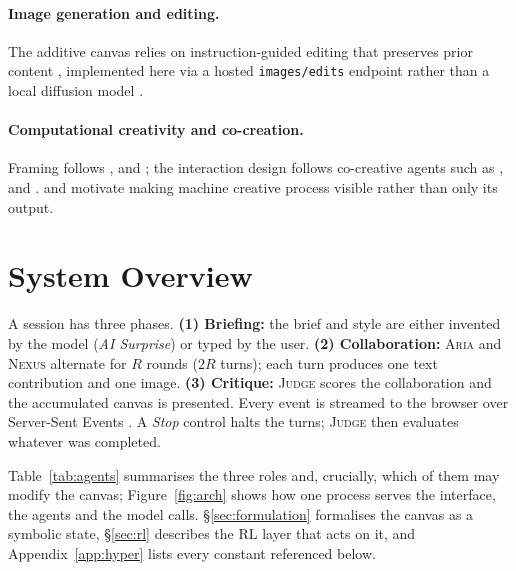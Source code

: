 \documentclass[11pt]{article}
\newcommand{\code}[1]{\texttt{\small #1}}
\newcommand{\ARIA}{\textsc{Aria}}
\newcommand{\NEXUS}{\textsc{Nexus}}
\newcommand{\JUDGE}{\textsc{Judge}}
\theoremstyle{plain}
\theoremstyle{definition}
\begin{document}
\paragraph{Image generation and editing.}
The additive canvas relies on instruction-guided editing that preserves prior
content \citep{meng2022sdedit,hertz2023prompt,brooks2023instructpix2pix},
implemented here via a hosted \code{images/edits} endpoint
\citep{microsoft2025azure} rather than a local diffusion model
\citep{rombach2022high}.

\paragraph{Computational creativity and co-creation.}
Framing follows \citet{boden2004creative}, \citet{colton2012computational} and
\citet{ritchie2007some}; the interaction design follows co-creative agents such
as \citet{davis2016empirically}, \citet{oh2018lead} and
\citet{karimi2020creative}. \citet{epstein2023art} and
\citet{doshi2024generative} motivate making machine creative process visible
rather than only its output.

\section{System Overview}
\label{sec:overview}
A session has three phases. \textbf{(1) Briefing:} the brief and style are
either invented by the model (\emph{AI Surprise}) or typed by the user.
\textbf{(2) Collaboration:} \ARIA{} and \NEXUS{} alternate for $R$ rounds
($2R$ turns); each turn produces one text contribution and one image.
\textbf{(3) Critique:} \JUDGE{} scores the collaboration and the accumulated
canvas is presented. Every event is streamed to the browser over Server-Sent
Events \citep{whatwg2024sse}. A \emph{Stop} control halts the turns; \JUDGE{}
then evaluates whatever was completed.

Table~\ref{tab:agents} summarises the three roles and, crucially, which of them
may modify the canvas; Figure~\ref{fig:arch} shows how one process serves the
interface, the agents and the model calls. \S\ref{sec:formulation} formalises
the canvas as a symbolic state, \S\ref{sec:rl} describes the RL layer that acts
on it, and Appendix~\ref{app:hyper} lists every constant referenced below.
\end{document}
